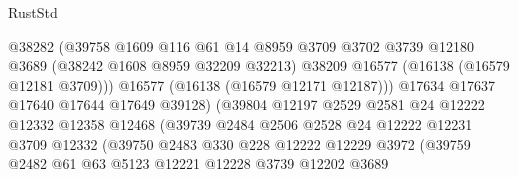 \begin{lexlean}{RustStd}
\begin{coremodule}
                                    @38282
                                    (@39758
                                      @1609
                                      @116
                                      @61
                                      @14
                                      @8959
                                      @3709
                                      @3702
                                      @3739
                                      @12180
                                      @3689
                                      (@38242 @1608 @8959 @32209 @32213)
                                      @38209
                                      @16577
                                      (@16138 (@16579 @12181 @3709)))
                                    @16577
                                    (@16138 (@16579 @12171 @12187)))
                                  @17634
                                  @17637
                                  @17640
                                  @17644
                                  @17649
                                  @39128)
                                (@39804
                                  @12197
                                  @2529
                                  @2581
                                  @24
                                  @12222
                                  @12332
                                  @12358
                                  @12468
                                  (@39739
                                    @2484
                                    @2506
                                    @2528
                                    @24
                                    @12222
                                    @12231
                                    @3709
                                    @12332
                                    (@39750
                                      @2483
                                      @330
                                      @228
                                      @12222
                                      @12229
                                      @3972
                                      (@39759
                                        @2482
                                        @61
                                        @63
                                        @5123
                                        @12221
                                        @12228
                                        @3739
                                        @12202
                                        @3689

\end{coremodule}
\end{lexlean}
